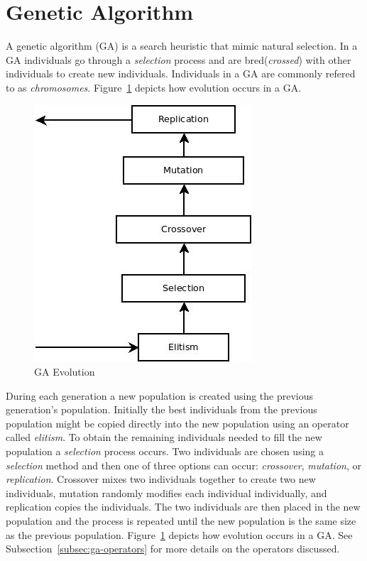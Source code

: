 \section{Genetic Algorithm}
\label{sec:ga}

A genetic algorithm (GA) is a search heuristic that mimic natural selection. In a GA individuals go through a \textit{selection} process and are bred(\textit{crossed}) with other individuals to create new individuals. Individuals in a GA are commonly refered to as \textit{chromosomes}. Figure~\ref{fig:gaFlowchart} depicts how evolution occurs in a GA.

\begin{figure}[H]
  \centering
  \includegraphics[bb=0 0 307 362,scale=0.5]{figures/GA.jpeg}
  \caption{GA Evolution}
  \label{fig:gaFlowchart}
\end{figure}

During each generation a new population is created using the previous generation's population. Initially the best individuals from the previous population might be copied directly into the new population using an operator called \textit{elitism}. To obtain the remaining individuals needed to fill the new population a \textit{selection} process occurs. Two individuals are chosen using a \textit{selection} method and then one of three options can occur: \textit{crossover}, \textit{mutation}, or \textit{replication}. Crossover mixes two individuals together to create two new individuals, mutation randomly modifies each individual individually, and replication copies the individuals. The two individuals are then placed in the new population and the process is repeated until the new population is the same size as the previous population. Figure~\ref{fig:gaFlowchart} depicts how evolution occurs in a GA. See Subsection~\ref{subsec:ga-operators} for more details on the operators discussed.


